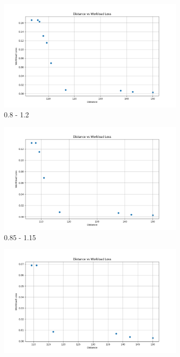 \documentclass[12pt,a4paper]{article}
\begin{document}
\begin{figure}[H]
    \centering
    \begin{subfigure}{0.32\textwidth}
        \centering
        \includegraphics[width=\textwidth]{figures/solve4-0.8.png}
        \caption{0.8 - 1.2}
        \label{fig:solve1}
    \end{subfigure}
    \hfill
    \begin{subfigure}{0.32\textwidth}
        \centering
        \includegraphics[width=\textwidth]{figures/solve4-0.85.png}
        \caption{0.85 - 1.15}
        \label{fig:solve2}
    \end{subfigure}
    \hfill
    \begin{subfigure}{0.32\textwidth}
        \centering
        \includegraphics[width=\textwidth]{figures/solve4-0.9.png}

\end{subfigure}
\end{figure}
\end{document}
